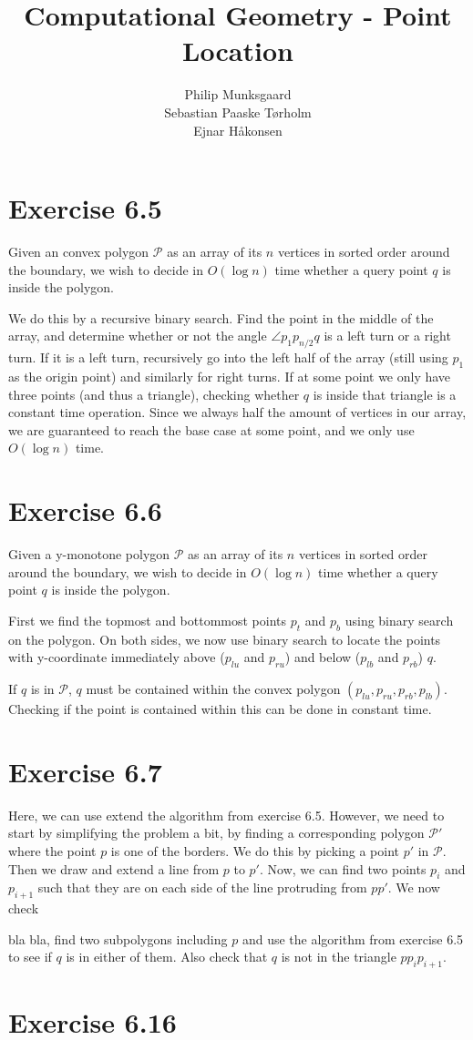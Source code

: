 \documentclass[11pt,a4paper]{article}
\title{Computational Geometry - Point Location}
\author{Philip Munksgaard \\ Sebastian Paaske Tørholm \\ Ejnar Håkonsen}
\begin{document}
\maketitle

\section{Exercise 6.5}

Given an convex polygon $\mathcal{P}$ as an array of its $n$ vertices
in sorted order around the boundary, we wish to decide in $O(\log n)$
time whether a query point $q$ is inside the polygon.

We do this by a recursive binary search. Find the point in the middle
of the array, and determine whether or not the angle $\angle p_1
p_{n/2} q$ is a left turn or a right turn. If it is a left turn,
recursively go into the left half of the array (still using $p_1$ as
the origin point) and similarly for right turns. If at some point we
only have three points (and thus a triangle), checking whether $q$ is
inside that triangle is a constant time operation. Since we always
half the amount of vertices in our array, we are guaranteed to reach
the base case at some point, and we only use $O(\log n)$ time.

\section{Exercise 6.6}
Given a y-monotone polygon $\mathcal{P}$ as an array of its $n$ vertices
in sorted order around the boundary, we wish to decide in $O(\log n)$
time whether a query point $q$ is inside the polygon.

First we find the topmost and bottommost points $p_t$ and $p_b$ using binary
search on the polygon. On both sides, we now use binary search to locate the
points with y-coordinate immediately above ($p_{lu}$ and $p_{ru}$) and below
($p_{lb}$ and $p_{rb}$) $q$.

If $q$ is in $\mathcal{P}$, $q$ must be contained within the convex polygon
$(p_{lu}, p_{ru}, p_{rb}, p_{lb})$. Checking if the point is contained
within this can be done in constant time.

\section{Exercise 6.7}

Here, we can use extend the algorithm from exercise 6.5. However, we
need to start by simplifying the problem a bit, by finding a
corresponding polygon $\mathcal{P}'$ where the point $p$ is one of the
borders. We do this by picking a point $p'$ in $\mathcal{P}$. Then we
draw and extend a line from $p$ to $p'$. Now, we can find two points
$p_i$ and $p_{i+1}$ such that they are on each side of the line
protruding from $pp'$. We now check

bla bla, find two subpolygons including $p$ and use the algorithm from
exercise 6.5 to see if $q$ is in either of them. Also check that $q$
is not in the triangle $pp_ip_{i+1}$.

\section{Exercise 6.16}
\end{document}
